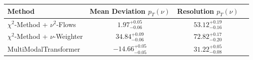     \begin{tabular}{lccc}
        \toprule
        Method & Mean Deviation $p_{T}({\nu})$ & Resolution $p_{T}({\nu})$ \\
        \midrule
        $\chi^2$-Method + $\nu^2$-Flows & $1.97^{+0.05}_{-0.06}$ & $53.12^{+0.19}_{-0.16}$ \\
        $\chi^2$-Method + $\nu$-Weighter & $34.84^{+0.09}_{-0.06}$ & $72.82^{+0.17}_{-0.20}$ \\
        MultiModalTransformer & $-14.66^{+0.05}_{-0.05}$ & $31.22^{+0.05}_{-0.08}$ \\
        \bottomrule
    \end{tabular}
